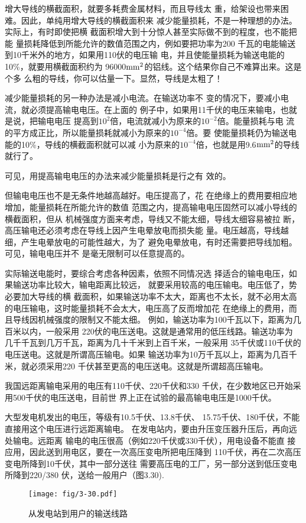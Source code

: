 增大导线的横截面积，就要多耗费金属材料，而且导线太
重，给架设也带来困难。因此，单纯用增大导线的横截面积来
减少能量损耗，不是一种理想的办法。实际上，有时即使把横
截面积增大到十分惊人甚至实际做不到的程度，也不能把能
量损耗降低到所能允许的数值范围之内，例如要把功率为200
千瓦的电能输送到10千米外的地方，如果用110伏的电压输
电，并且使能量损耗为输送电能的10\%，就要用横截面积约为
96000${\rm mm}^2$的铝线。这个结果你自己不难算出来。这是个多
么粗的导线，你可以估量一下。显然，导线是太粗了！

减少能量损耗的另一种办法是减小电流。在输送功率不
变的情况下，要减小电流，就必须提高输电电压。在上面的
例子中，如果用11千伏的电压来输电，也就是说，把输电电压
提高到$10^2$倍，电流就减小为原来的$10^{-2}$倍。能量损耗与电
流的平方成正比，所以能量损耗就减小为原来的$10^{-4}$倍。要
使能量损耗仍为输送电能的10\%，导线的横截面积就可以减
小为原来的$10^{-4}$倍，也就是用9.6${\rm mm}^2$的导线就行了。

可见，用提高输电电压的办法来减少能量损耗是行之有
效的。

但输电电压也不是无条件地越高越好。电压提高了，花
在绝缘上的费用要相应地增加，能量损耗在所能允许的数值
范围之内，提高输电电压固然可以减小导线的横截面积，但从
机械强度方面来考虑，导线又不能太细，导线太细容易被拉
断，高压输电还必须考虑在导线上因产生电晕放电而损失能
量。电压越高，导线越细，产生电晕放电的可能性越大，为了
避免电晕放电，有时还需要把导线加粗。可见，输电电压并不
是毫无限制可以任意提高的。

实际输送电能时，要综合考虑各种因素，依照不同情况选
择适合的输电电压，如果输送功率比较大，输电距离比较远，
就要采用较高的电压输电。电压低了，势必要加大导线的横
截面积，如果输送功率不太大，距离也不太长，就不必用太高
的电压输电，这时能量损耗不会太大，电压高了反而增加花
在绝缘上的费用，而且导线因机械强度的限制又不能太细。
例如，输送功率为100千瓦以下，距离为几百米以内，一般采用
220伏的电压送电。这就是通常用的低压线路。输送功率为
几千千瓦到几万千瓦，距离为几十千米到上百千米，一般采用
35千伏或110千伏的电压送电。这就是所谓高压输电。如果
输送功率为10万千瓦以上，距离为几百千米，就必须采用220
千伏甚至更高的电压送电。这就是所谓超高压输电。

我国远距离输电采用的电压有110千伏、220千伏和330
千伏，在少数地区已开始采用500千伏的电压送电，目前世
界上正在试验的最高输电电压是1000千伏。

大型发电机发出的电压，等级有10.5千伏、13.8千伏、
15.75千伏、180千伏，不能直接用这个电压进行远距离输电。
在发电站内，要由升压变压器升压后，再向远处输电。远距离
输电的电压很高（例如220千伏或330千伏），用电设备不能直
接应用，因此送到用电区，要在一次高压变电所把电压降到
110千伏，再在二次高压变电所降到10千伏，其中一部分送往
需要高压电的工厂，另一部分送到低压变电所降到220/380
伏，送给一般用户（图3.30).
\begin{figure}[htp]\centering
    \texttt{[image: fig/3-30.pdf]}
    \caption{从发电站到用户的输送线路}
    \end{figure}

